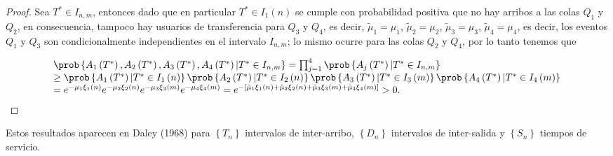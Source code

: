 \begin{proof}
Sea $T^{*}\in I_{n,m}$, entonces dado que en particular $T^{*}\in I_{1}\left(n\right)$ se cumple con probabilidad positiva que no hay arribos a las colas $Q_{1}$ y $Q_{2}$, en consecuencia, tampoco hay usuarios de transferencia para $Q_{3}$ y $Q_{4}$, es decir, $\tilde{\mu}_{1}=\mu_{1}$, $\tilde{\mu}_{2}=\mu_{2}$, $\tilde{\mu}_{3}=\mu_{3}$, $\tilde{\mu}_{4}=\mu_{4}$, es decir, los eventos $Q_{1}$ y $Q_{3}$ son condicionalmente independientes en el intervalo $I_{n,m}$; lo mismo ocurre para las colas $Q_{2}$ y $Q_{4}$, por lo tanto tenemos que


\begin{eqnarray}
\begin{array}{l}
\prob\left\{A_{1}\left(T^{*}\right),A_{2}\left(T^{*}\right),
A_{3}\left(T^{*}\right),A_{4}\left(T^{*}\right)|T^{*}\in I_{n,m}\right\}
=\prod_{j=1}^{4}\prob\left\{A_{j}\left(T^{*}\right)|T^{*}\in I_{n,m}\right\}\\
\geq\prob\left\{A_{1}\left(T^{*}\right)|T^{*}\in I_{1}\left(n\right)\right\}
\prob\left\{A_{2}\left(T^{*}\right)|T^{*}\in I_{2}\left(n\right)\right\}
\prob\left\{A_{3}\left(T^{*}\right)|T^{*}\in I_{3}\left(m\right)\right\}
\prob\left\{A_{4}\left(T^{*}\right)|T^{*}\in I_{4}\left(m\right)\right\}\\
=e^{-\mu_{1}\xi_{1}\left(n\right)}
e^{-\mu_{2}\xi_{2}\left(n\right)}
e^{-\mu_{3}\xi_{3}\left(m\right)}
e^{-\mu_{4}\xi_{4}\left(m\right)}
=e^{-\left[\tilde{\mu}_{1}\xi_{1}\left(n\right)
+\tilde{\mu}_{2}\xi_{2}\left(n\right)
+\tilde{\mu}_{3}\xi_{3}\left(m\right)
+\tilde{\mu}_{4}\xi_{4}
\left(m\right)\right]}>0.
\end{array}
\end{eqnarray}
\end{proof}


Estos resultados aparecen en Daley (1968) \cite{Daley68} para $\left\{T_{n}\right\}$ intervalos de inter-arribo, $\left\{D_{n}\right\}$ intervalos de inter-salida y $\left\{S_{n}\right\}$ tiempos de servicio.

